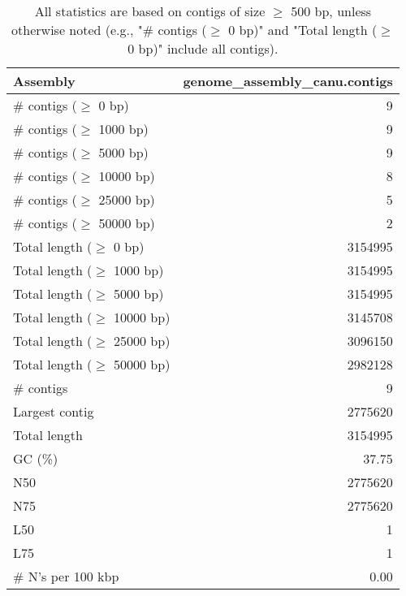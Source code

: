 \documentclass[12pt,a4paper]{article}
\begin{document}
\begin{table}[ht]
\begin{center}
\caption{All statistics are based on contigs of size $\geq$ 500 bp, unless otherwise noted (e.g., "\# contigs ($\geq$ 0 bp)" and "Total length ($\geq$ 0 bp)" include all contigs).}
\begin{tabular}{|l*{1}{|r}|}
\hline
Assembly & genome\_assembly\_canu.contigs \\ \hline
\# contigs ($\geq$ 0 bp) & 9 \\ \hline
\# contigs ($\geq$ 1000 bp) & 9 \\ \hline
\# contigs ($\geq$ 5000 bp) & 9 \\ \hline
\# contigs ($\geq$ 10000 bp) & 8 \\ \hline
\# contigs ($\geq$ 25000 bp) & 5 \\ \hline
\# contigs ($\geq$ 50000 bp) & 2 \\ \hline
Total length ($\geq$ 0 bp) & 3154995 \\ \hline
Total length ($\geq$ 1000 bp) & 3154995 \\ \hline
Total length ($\geq$ 5000 bp) & 3154995 \\ \hline
Total length ($\geq$ 10000 bp) & 3145708 \\ \hline
Total length ($\geq$ 25000 bp) & 3096150 \\ \hline
Total length ($\geq$ 50000 bp) & 2982128 \\ \hline
\# contigs & 9 \\ \hline
Largest contig & 2775620 \\ \hline
Total length & 3154995 \\ \hline
GC (\%) & 37.75 \\ \hline
N50 & 2775620 \\ \hline
N75 & 2775620 \\ \hline
L50 & 1 \\ \hline
L75 & 1 \\ \hline
\# N's per 100 kbp & 0.00 \\ \hline
\end{tabular}
\end{center}
\end{table}
\end{document}
